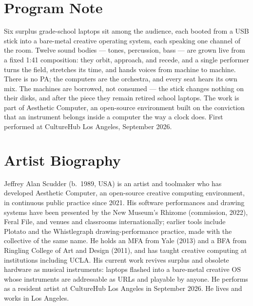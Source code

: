 \documentclass[10pt,letterpaper]{article}
\begin{document}
\section{Program Note}

Six surplus grade-school laptops sit among the audience, each booted from a
USB stick into a bare-metal creative operating system, each speaking one
channel of the room. Twelve sound bodies --- tones, percussion, bass --- are
grown live from a fixed 1:41 composition: they orbit, approach, and recede,
and a single performer turns the field, stretches its time, and hands voices
from machine to machine. There is no PA; the computers are the orchestra,
and every seat hears its own mix. The machines are borrowed, not consumed
--- the stick changes nothing on their disks, and after the piece they
remain retired school laptops. The work is part of Aesthetic Computer, an
open-source environment built on the conviction that an instrument belongs
inside a computer the way a clock does. First performed at CultureHub Los
Angeles, September 2026.

\section{Artist Biography}

Jeffrey Alan Scudder (b.\ 1989, USA) is an artist and toolmaker who has
developed Aesthetic Computer, an open-source creative computing environment,
in continuous public practice since 2021. His software performances and
drawing systems have been presented by the New Museum's Rhizome (commission,
2022), Feral File, and venues and classrooms internationally; earlier tools
include Plotato and the Whistlegraph drawing-performance practice, made with
the collective of the same name. He holds an MFA from Yale (2013) and a BFA
from Ringling College of Art and Design (2011), and has taught creative
computing at institutions including UCLA. His current work revives surplus
and obsolete hardware as musical instruments: laptops flashed into a
bare-metal creative OS whose instruments are addressable as URLs and
playable by anyone. He performs as a resident artist at CultureHub Los
Angeles in September 2026. He lives and works in Los Angeles.
\end{document}
